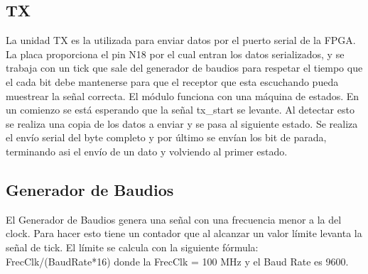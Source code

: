 \subsection{TX}
La unidad TX es la utilizada para enviar datos por el puerto serial de la FPGA. La placa proporciona el pin N18 por el cual entran los datos serializados, y se trabaja con un tick que sale del generador de baudios para respetar el tiempo que el cada bit debe mantenerse para que el receptor que esta escuchando pueda muestrear la señal correcta.
El m\'odulo funciona con una m\'aquina de estados. En un comienzo se est\'a esperando que la señal tx\_start se levante. Al detectar esto se realiza una copia de los datos a enviar y se pasa al siguiente estado. Se realiza el env\'io serial del byte completo y por \'ultimo se env\'ian los bit de parada, terminando asi el env\'io de un dato y volviendo al primer estado.  


\subsection{Generador de Baudios}
El Generador de Baudios genera una señal con una frecuencia menor a la del clock. Para hacer esto tiene un contador que al alcanzar un valor l\'imite levanta la señal de tick. El l\'imite se calcula con la siguiente f\'ormula: FrecClk/(BaudRate*16) donde la FrecClk = 100 MHz y el Baud Rate es 9600.